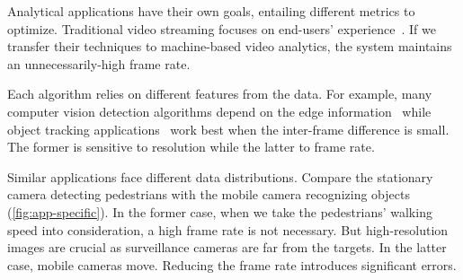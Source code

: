 Analytical applications have their own goals, entailing different metrics to
optimize. Traditional video streaming focuses on end-users'
experience~\cite{yin2015control, michalos2012dynamic, pantos2016http}. If we
transfer their techniques to machine-based video analytics, the system maintains
an unnecessarily-high frame rate.

Each algorithm relies on different features from the data. For example, many
computer vision detection algorithms depend on the edge
information~\cite{canny1986computational, lowe2004distinctive, viola2001rapid}
while object tracking applications~\cite{allen2004object} work best when the
inter-frame difference is small. The former is sensitive to resolution while the
latter to frame rate.

Similar applications face different data distributions. Compare the stationary
camera detecting pedestrians with the mobile camera recognizing objects
(\autoref{fig:app-specific}). In the former case, when we take the pedestrians'
walking speed into consideration, a high frame rate is not necessary. But
high-resolution images are crucial as surveillance cameras are far from the
targets. In the latter case, mobile cameras move. Reducing the frame rate
introduces significant errors.

